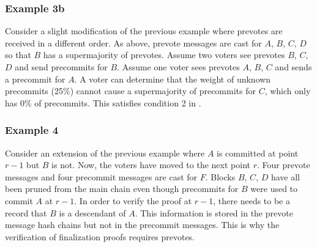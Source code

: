 \begin{figure}[H]
\end{figure}

\subsubsection*{Example 3b}

Consider a slight modification of the previous example where prevotes are received in a different order.
As above, prevote messages are cast for $A$, $B$, $C$, $D$ so that $B$ has a supermajority of prevotes.
Assume two voters see prevotes $B$, $C$, $D$ and send precommits for $B$.
Assume one voter sees prevotes $A$, $B$, $C$ and sends a precommit for $A$.
A voter can determine that the weight of unknown precommits (25\%) cannot cause a supermajority of precommits for $C$, which only has 0\% of precommits.
This satisfies condition 2 in .

\begin{figure}[H]
\end{figure}

\subsubsection*{Example 4}

Consider an extension of the previous example where $A$ is committed at point $r-1$ but $B$ is not.
Now, the voters have moved to the next point $r$.
Four prevote messages and four precommit messages are cast for $F$.
Blocks $B$, $C$, $D$ have all been pruned from the main chain even though precommits for $B$ were used to commit $A$ at $r-1$.
In order to verify the proof at $r-1$, there needs to be a record that $B$ is a descendant of $A$.
This information is stored in the prevote message hash chains but not in the precommit messages.
This is why the verification of finalization proofs requires prevotes.


